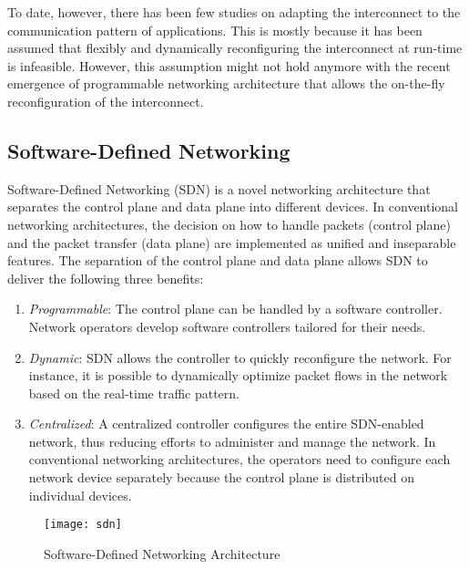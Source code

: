 To date, however, there has been few studies on adapting the
interconnect to the communication pattern of applications. This is mostly
because it has been assumed that flexibly and dynamically reconfiguring the
interconnect at run-time is infeasible. However, this assumption might not hold
anymore with the recent emergence of programmable networking architecture that
allows the on-the-fly reconfiguration of the interconnect.

\subsection{Software-Defined Networking}\label{sec:i-sdn}

Software-Defined Networking (SDN) is a novel networking architecture
that separates the control plane and data plane into different devices.
In conventional networking architectures, the decision on how to handle
packets (control plane) and the packet transfer (data plane) are
implemented as unified and inseparable features. The separation of the
control plane and data plane allows SDN to deliver the following three
benefits:

\begin{enumerate}
\item
  \emph{Programmable}: The control plane can be handled by a software
  controller. Network operators develop software controllers tailored for
  their needs.
\item
  \emph{Dynamic}: SDN allows the controller to quickly reconfigure the
  network. For instance, it is possible to dynamically optimize packet
  flows in the network based on the real-time traffic pattern.
\item
  \emph{Centralized}: A centralized controller configures the entire
  SDN-enabled network, thus reducing efforts to administer and manage
  the network. In conventional networking architectures, the operators
  need to configure each network device separately because the control
  plane is distributed on individual devices.
\end{enumerate}

\begin{figure}
    \centering
    \texttt{[image: sdn]}
    \caption{Software-Defined Networking Architecture}%
    \label{fig:sdn-architecture}
\end{figure}

